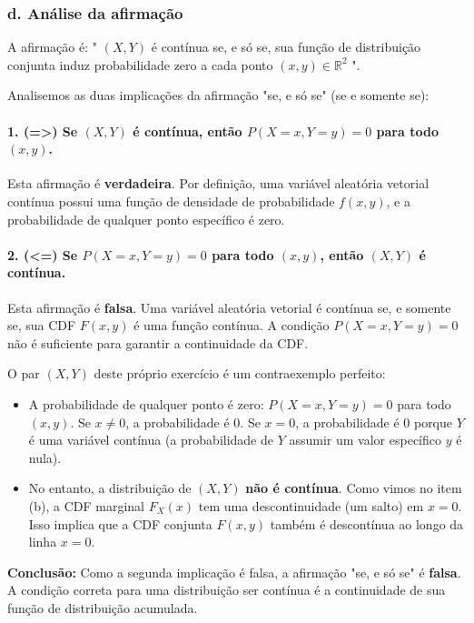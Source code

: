 \documentclass[12pt]{article}
\begin{document}
\subsubsection*{d. Análise da afirmação}
A afirmação é: " $(X,Y)$ é contínua se, e só se, sua função de distribuição conjunta induz probabilidade zero a cada ponto $(x,y) \in \mathbb{R}^2$ ".

Analisemos as duas implicações da afirmação "se, e só se" (se e somente se):

\paragraph{1. (=>) Se $(X,Y)$ é contínua, então $P(X=x, Y=y)=0$ para todo $(x,y)$.}
Esta afirmação é \textbf{verdadeira}. Por definição, uma variável aleatória vetorial contínua possui uma função de densidade de probabilidade $f(x,y)$, e a probabilidade de qualquer ponto específico é zero.

\paragraph{2. (<=) Se $P(X=x, Y=y)=0$ para todo $(x,y)$, então $(X,Y)$ é contínua.}
Esta afirmação é \textbf{falsa}. Uma variável aleatória vetorial é contínua se, e somente se, sua CDF $F(x,y)$ é uma função contínua. A condição $P(X=x, Y=y)=0$ não é suficiente para garantir a continuidade da CDF.

O par $(X,Y)$ deste próprio exercício é um contraexemplo perfeito:
\begin{itemize}
    \item A probabilidade de qualquer ponto é zero: $P(X=x, Y=y) = 0$ para todo $(x,y)$. Se $x \ne 0$, a probabilidade é 0. Se $x=0$, a probabilidade é 0 porque $Y$ é uma variável contínua (a probabilidade de $Y$ assumir um valor específico $y$ é nula).
    \item No entanto, a distribuição de $(X,Y)$ \textbf{não é contínua}. Como vimos no item (b), a CDF marginal $F_X(x)$ tem uma descontinuidade (um salto) em $x=0$. Isso implica que a CDF conjunta $F(x,y)$ também é descontínua ao longo da linha $x=0$.
\end{itemize}

\textbf{Conclusão:} Como a segunda implicação é falsa, a afirmação "se, e só se" é \textbf{falsa}. A condição correta para uma distribuição ser contínua é a continuidade de sua função de distribuição acumulada. \hfill \qedsymbol
\end{document}
